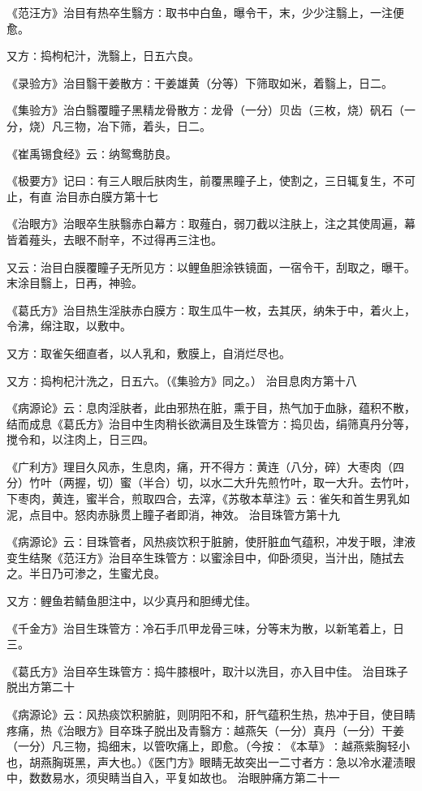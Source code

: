 \documentclass[a4paper,12pt,UTF8,twoside]{ctexbook}
\begin{document}
《范汪方》治目有热卒生翳方∶取书中白鱼，曝令干，末，少少注翳上，一注便愈。

又方∶捣枸杞汁，洗翳上，日五六良。

《录验方》治目翳干姜散方∶干姜雄黄（分等）下筛取如米，着翳上，日二。

《集验方》治白翳覆瞳子黑精龙骨散方∶龙骨（一分）贝齿（三枚，烧）矾石（一分，烧）凡三物，冶下筛，着头，日二。

《崔禹锡食经》云∶纳鸳鸯肪良。

《极要方》记曰∶有三人眼后肤肉生，前覆黑瞳子上，使割之，三日辄复生，不可止，有直
治目赤白膜方第十七

《治眼方》治眼卒生肤翳赤白幕方∶取薤白，弱刀截以注肤上，注之其使周遍，幕皆着薤头，去眼不耐辛，不过得再三注也。

又云∶治目白膜覆瞳子无所见方∶以鲤鱼胆涂铁镜面，一宿令干，刮取之，曝干。末涂目翳上，日再，神验。

《葛氏方》治目热生淫肤赤白膜方∶取生瓜牛一枚，去其厌，纳朱于中，着火上，令沸，绵注取，以敷中。

又方∶取雀矢细直者，以人乳和，敷膜上，自消烂尽也。

又方∶捣枸杞汁洗之，日五六。（《集验方》同之。）
治目息肉方第十八

《病源论》云∶息肉淫肤者，此由邪热在脏，熏于目，热气加于血脉，蕴积不散，结而成息《葛氏方》治目中生肉稍长欲满目及生珠管方∶捣贝齿，绢筛真丹分等，搅令和，以注肉上，日三四。

《广利方》理目久风赤，生息肉，痛，开不得方∶黄连（八分，碎）大枣肉（四分）竹叶（两握，切）蜜（半合）切，以水二大升先煎竹叶，取一大升。去竹叶，下枣肉，黄连，蜜半合，煎取四合，去滓，《苏敬本草注》云∶雀矢和首生男乳如泥，点目中。怒肉赤脉贯上瞳子者即消，神效。
治目珠管方第十九

《病源论》云∶目珠管者，风热痰饮积于脏腑，使肝脏血气蕴积，冲发于眼，津液变生结聚《范汪方》治目卒生珠管方∶以蜜涂目中，仰卧须臾，当汁出，随拭去之。半日乃可渗之，生蜜尤良。

又方∶鲤鱼若鲭鱼胆注中，以少真丹和胆缚尤佳。

《千金方》治目生珠管方∶冷石手爪甲龙骨三味，分等末为散，以新笔着上，日三。

《葛氏方》治目卒生珠管方∶捣牛膝根叶，取汁以洗目，亦入目中佳。
治目珠子脱出方第二十

《病源论》云∶风热痰饮积腑脏，则阴阳不和，肝气蕴积生热，热冲于目，使目睛疼痛，热《治眼方》目卒珠子脱出及青翳方∶越燕矢（一分）真丹（一分）干姜（一分）凡三物，捣细末，以管吹痛上，即愈。（今按∶《本草》∶越燕紫胸轻小也，胡燕胸斑黑，声大也。）《医门方》眼睛无故突出一二寸者方∶急以冷水灌渍眼中，数数易水，须臾睛当自入，平复如故也。
治眼肿痛方第二十一
\end{document}
